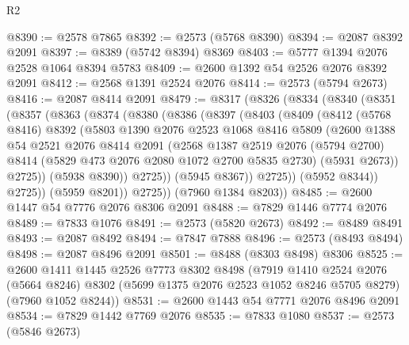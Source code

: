 \begin{lexlean}{R2}
\begin{coremodule}
@8390 := @2578 @7865
@8392 := @2573 (@5768 @8390)
@8394 := @2087 @8392 @2091
@8397 := @8389 (@5742 @8394) @8369
@8403 := @5777 @1394 @2076 @2528 @1064 @8394 @5783
@8409 := @2600 @1392 @54 @2526 @2076 @8392 @2091
@8412 := @2568 @1391 @2524 @2076
@8414 := @2573 (@5794 @2673)
@8416 := @2087 @8414 @2091
@8479 := @8317
    (@8326
      (@8334
        (@8340
          (@8351
            (@8357
              (@8363
                (@8374
                  (@8380
                    (@8386
                      (@8397
                        (@8403
                          (@8409
                            (@8412
                              (@5768 @8416)
                              @8392
                              (@5803
                                @1390
                                @2076
                                @2523
                                @1068
                                @8416
                                @5809
                                (@2600
                                  @1388
                                  @54
                                  @2521
                                  @2076
                                  @8414
                                  @2091
                                  (@2568
                                    @1387
                                    @2519
                                    @2076
                                    (@5794 @2700)
                                    @8414
                                    (@5829 @473 @2076 @2080 @1072 @2700 @5835 @2730)
                                    (@5931 @2673))
                                  @2725))
                              (@5938 @8390))
                            @2725))
                        (@5945 @8367))
                      @2725))
                  (@5952 @8344))
                @2725))
            (@5959 @8201))
          @2725))
      (@7960 @1384 @8203))
@8485 := @2600 @1447 @54 @7776 @2076 @8306 @2091
@8488 := @7829 @1446 @7774 @2076
@8489 := @7833 @1076
@8491 := @2573 (@5820 @2673)
@8492 := @8489 @8491
@8493 := @2087 @8492
@8494 := @7847 @7888
@8496 := @2573 (@8493 @8494)
@8498 := @2087 @8496 @2091
@8501 := @8488 (@8303 @8498) @8306
@8525 := @2600
    @1411
    @1445
    @2526
    @7773
    @8302
    @8498
    (@7919
      @1410
      @2524
      @2076
      (@5664 @8246)
      @8302
      (@5699 @1375 @2076 @2523 @1052 @8246 @5705 @8279)
      (@7960 @1052 @8244))
@8531 := @2600 @1443 @54 @7771 @2076 @8496 @2091
@8534 := @7829 @1442 @7769 @2076
@8535 := @7833 @1080
@8537 := @2573 (@5846 @2673)

\end{coremodule}
\end{lexlean}
